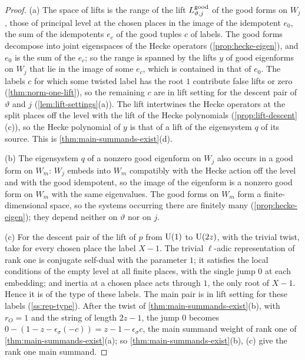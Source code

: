 \begin{proof}
(a) The space of lifts is the range of the lift $L^{\rm good}_{\vartheta,j}$ of the good forms on $W_j$, those of principal level at the chosen places in the image of the idempotent $e_0$, the sum of the idempotents $e_c$ of the good tuples $c$ of labels. The good forms decompose into joint eigenspaces of the
Hecke operators (\cref{prop:hecke-eigen}), and $e_0$ is the sum of the $e_c$; so the range is spanned by the lifts $y$ of good eigenforms on $W_j$ that lie in the image of some $e_c$, which is contained in that of $e_0$. The labels $c$ for which some twisted label has the root $1$ contribute false lifts or zero (\cref{thm:norm-one-lift}), so the
remaining $c$ are in lift setting for the descent pair of $\vartheta$ and $j$ (\cref{lem:lift-settings}(a)). The lift intertwines the Hecke operators at the split places off the level with the lift of the Hecke polynomials (\cref{prop:lift-descent}(c)), so the Hecke polynomial of $y$ is that of a lift of the eigensystem $q$ of its source. This is
\cref{thm:main-summands-exist}(d).

(b) The eigensystem $q$ of a nonzero good eigenform on $W_j$ also occurs in a good form on $W_m$: $W_j$ embeds into $W_m$ compatibly with the Hecke action off the level and with the good idempotent, so the image of the eigenform is a nonzero good form on $W_m$ with the same eigenvalues. The good forms on $W_m$ form a finite-dimensional
space, so the systems occurring there are finitely many (\cref{prop:hecke-eigen}); they depend neither on $\vartheta$ nor on $j$.

(c) For the descent pair of the lift of $p$ from $\operatorname{U}(1)$ to $\operatorname{U}(2z)$, with the trivial twist, take for every chosen place the label $X-1$. The trivial $\ell$-adic representation of rank one is conjugate self-dual with the parameter $1$; it satisfies the local conditions of the empty level at all finite places, with the single jump
$0$ at each embedding; and inertia at a chosen place acts through $1$, the only root of $X-1$. Hence it is of the type of these labels. The main pair is in lift setting for these labels (\cref{ss:rep-type}). After the twist of \cref{thm:main-summands-exist}(b), with $r_O=1$ and the string of length $2z-1$, the jump $0$ becomes $0-(1-z-\epsilon_\sigma(-c))=z-1-\epsilon_\sigma c$, the main summand weight of rank one of \cref{thm:main-summands-exist}(a); so \cref{thm:main-summands-exist}(b), (c) give the rank one main summand.
\end{proof}

